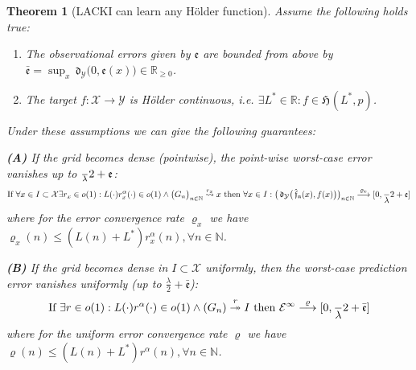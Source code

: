 \documentclass{article} %
\newtheorem{thm}{Theorem}[section]
\theoremstyle{definition}
\theoremstyle{remark}
\newcommand{\Real}{\mathbb R}
\newcommand{\nat}{\mathbb N}
\newcommand{\inspace}{\ensuremath{ \mathcal X}}
\newcommand{\outspace}{\ensuremath{ \mathcal Y}}
\newcommand{\grid}{\ensuremath{  G}}
\newcommand{\metric}{\, \mathfrak{d}} %
\newcommand{\Metrico}[2]{\metric_\outspace\bigl(#1,#2\bigr) }
\newcommand{\predfn}{\, \mathfrak{  \hat f_n}} %
\newcommand{\hexp}{{ \alpha }}%
\newcommand{\hestthresh}{\ensuremath{ \lambda}}
\newcommand{\hoelset}[3]{\mathfrak{H}_{#2}(#1,#3)}
\newcommand{\obserr}{\mathfrak e} %
\newcommand{\obserrbnd}{\bar{\mathfrak e}}
\newcommand{\seq}[2]{\ensuremath{\bigl(#1\bigr)_{#2}}}
\newcommand{\convto}{\longrightarrow}
\newcommand{\bd}{\leadsto} %
\newcommand{\bdu}{\twoheadrightarrow} %
\newcommand{\errmetric}{\mathcal E} %
\begin{document}
\begin{thm}[LACKI can learn any H\"older function] \label{thm:convergenceifboundedconstandsamplecons_LACKI}
Assume the following holds true:
\begin{enumerate}
\item The observational errors given by $\obserr$ are bounded from above by $\obserrbnd= \sup_x \metric_\outspace\bigl(0,\obserr(x)\bigr) \in \Real_{\geq 0}$.
\item  The target $f: \inspace \to \outspace$ is H\"older continuous, i.e. $\exists L^* \in \Real: f \in \hoelset {L^*}{}  p$.
\end{enumerate}
%

Under these assumptions we can give the following guarantees: 

\textbf{(A)} If the grid becomes dense (pointwise), the point-wise worst-case error vanishes up to $\frac \hestthresh 2 + \obserr$:
$$
\text{If }\forall x \in I \subset \inspace \exists r_x \in o(1) : L(\cdot) r_x^\hexp(\cdot) \in o(1) \wedge \seq{G_n}{n \in \nat} \stackrel{r_x}{\bd} x  \text{ then }\forall x \in I : \seq{\Metrico{\predfn(x)}{f(x)}}{n \in \nat} \stackrel{\varrho_x} \convto [0,\frac \hestthresh 2 + \obserr]$$
where for the error convergence rate $\varrho_x$ we have $\varrho_x(n) \leq (L(n)+ L^*) r_x^\hexp(n) , \forall n \in \nat$. 

\textbf{(B)} If the grid becomes dense in $I \subset \inspace$ uniformly, then the worst-case prediction error vanishes uniformly (up to $\frac \lambda 2 + \obserrbnd$):
$$\text{If } \exists r \in o(1) :  L(\cdot) r^\hexp(\cdot) \in o(1) \wedge (G_n) \stackrel{r}{\bdu} I  \text{ then }  \errmetric^\infty \stackrel{\varrho}{\convto} [0,\frac \hestthresh 2 + \obserrbnd]$$
where for the uniform error convergence rate $\varrho$ we have $\varrho(n) \leq (L(n)+ L^*) r^\hexp(n) , \forall n \in \nat$. 

%
%
%



\end{thm}
\end{document}
